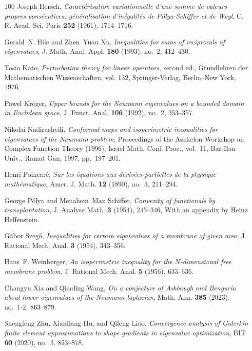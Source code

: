 \documentclass{amsart}
\numberwithin{equation}{section}
\theoremstyle{plain}
\theoremstyle{definition}
\theoremstyle{plain}
\theoremstyle{remark}
\numberwithin{figure}{section}
\begin{document}
\begin{thebibliography}{100}
Joseph Hersch, \emph{{C}aract\'erisation variationnelle d'une somme de valeurs
  propres cons\'ecutives; g\'en\'eralisation d'in\'egalit\'es de
  {P}\'olya-{S}chiffer et de {W}eyl}, C. R. Acad. Sci. Paris \textbf{252}
  (1961), 1714--1716. 

Gerald~N. Hile and Zhen~Yuan Xu, \emph{{I}nequalities for sums of reciprocals
  of eigenvalues}, J. Math. Anal. Appl. \textbf{180} (1993), no.~2, 412--430. 

Tosio Kato, \emph{{P}erturbation theory for linear operators}, second ed.,
  Grundlehren der Mathematischen Wissenschaften, vol. 132, Springer-Verlag,
  Berlin--New York, 1976. 

Pawel Kr\"oger, \emph{{U}pper bounds for the {N}eumann eigenvalues on a bounded
  domain in {E}uclidean space}, J. Funct. Anal. \textbf{106} (1992), no.~2,
  353--357. 

Nikolai Nadirashvili, \emph{{C}onformal maps and isoperimetric inequalities for
  eigenvalues of the {N}eumann problem}, {P}roceedings of the {A}shkelon
  {W}orkshop on {C}omplex {F}unction {T}heory (1996), Israel Math. Conf. Proc.,
  vol.~11, Bar-Ilan Univ., Ramat Gan, 1997, pp.~197--201. 

Henri Poincar{\'e}, \emph{{S}ur les {\'e}quations aux d{\'e}riv{\'e}es
  partielles de la physique math{\'e}matique}, Amer. J. Math. \textbf{12}
  (1890), no.~3, 211--294. 

George P\'olya and Menahem~Max Schiffer, \emph{{C}onvexity of functionals by
  transplantation}, J. Analyse Math. \textbf{3} (1954), 245--346, With an
  appendix by Heinz Helfenstein. 

G\'abor Szeg\H{o}, \emph{{I}nequalities for certain eigenvalues of a membrane
  of given area}, J. Rational Mech. Anal. \textbf{3} (1954), 343--356. 

Hans~F. Weinberger, \emph{{A}n isoperimetric inequality for the
  {$N$}-dimensional free membrane problem}, J. Rational Mech. Anal. \textbf{5}
  (1956), 633--636. 

Changyu Xia and Qiaoling Wang, \emph{{O}n a conjecture of {A}shbaugh and
  {B}enguria about lower eigenvalues of the {N}eumann laplacian}, Math. Ann.
  \textbf{385} (2023), no.~1-2, 863--879.  

Shengfeng {Z}hu, Xianliang Hu, and Qifeng Liao, \emph{{C}onvergence analysis of
  {G}alerkin finite element approximations to shape gradients in eigenvalue
  optimization}, BIT \textbf{60} (2020), no.~3, 853--878. 

\end{thebibliography}

	
\end{document}
